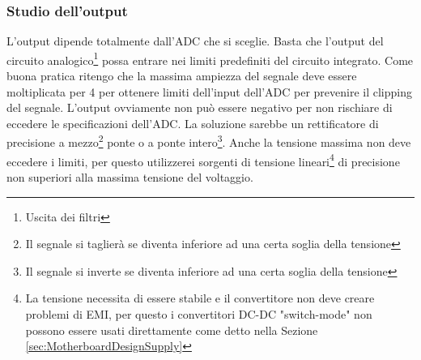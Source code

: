 \documentclass[a4paper, 10pt, final]{article} %
\begin{document}
    \subsubsection{Studio dell'output}\label{sec:SensorboardDesignOutput}
    L'output dipende totalmente dall'ADC che si sceglie.
    Basta che l'output del circuito analogico\footnote{Uscita dei filtri} possa entrare nei limiti predefiniti del circuito integrato.
    Come buona pratica ritengo che la massima ampiezza del segnale deve essere moltiplicata per 4 per ottenere limiti dell'input dell'ADC per prevenire il clipping del segnale.
    L'output ovviamente non pu\`{o} essere negativo per non rischiare di eccedere le specificazioni dell'ADC.
    La soluzione sarebbe un rettificatore di precisione a mezzo\footnote{Il segnale si taglier\`{a} se diventa inferiore ad una certa soglia della tensione} ponte o a ponte intero\footnote{Il segnale si inverte se diventa inferiore ad una certa soglia della tensione}.
    Anche la tensione massima non deve eccedere i limiti, per questo utilizzerei sorgenti di tensione lineari\footnote{La tensione necessita di essere stabile e il convertitore non deve creare problemi di EMI, per questo i convertitori DC-DC "switch-mode" non possono essere usati direttamente come detto nella Sezione \ref{sec:MotherboardDesignSupply}} di precisione non superiori alla massima tensione del voltaggio.
\end{document}

